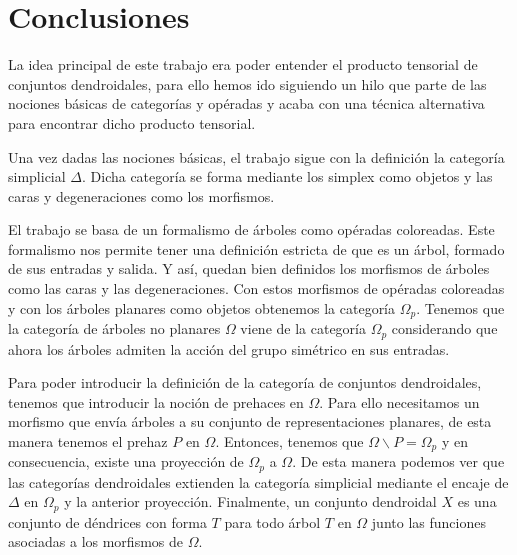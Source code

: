 \documentclass[11pt,a4paper,openright,oneside]{article}
\numberwithin{equation}{section}
\theoremstyle{definition}
\begin{document}

\setcounter{page}{1}



\newpage


\newpage


\newpage


\newpage
\section{Conclusiones}

La idea principal de este trabajo era poder entender el producto tensorial de conjuntos dendroidales, para ello hemos ido siguiendo un hilo que parte de las nociones b\'asicas de categor\'ias y op\'eradas y acaba con una t\'ecnica alternativa para encontrar dicho producto tensorial.

Una vez dadas las nociones b\'asicas, el trabajo sigue con la definici\'on la categor\'ia simplicial $\Delta$. Dicha categor\'ia se forma mediante los simplex como objetos y las caras y degeneraciones como los morfismos.

El trabajo se basa de un formalismo de \'arboles como op\'eradas coloreadas. Este formalismo nos permite tener una definici\'on estricta de que es un \'arbol, formado de sus entradas y salida.
Y as\'i, quedan bien definidos los morfismos de \'arboles como las caras y las degeneraciones. Con estos morfismos de op\'eradas coloreadas y con los \'arboles planares como objetos obtenemos la categor\'ia $\Omega_p$.
Tenemos que la categor\'ia de \'arboles no planares $\Omega$ viene de la categor\'ia $\Omega_p$ considerando que ahora los \'arboles admiten la acci\'on del grupo sim\'etrico en sus entradas.

Para poder introducir la definici\'on de la categor\'ia de conjuntos dendroidales, tenemos que introducir la noci\'on de prehaces en $\Omega$. Para ello necesitamos un morfismo que env\'ia \'arboles a su conjunto de representaciones planares, de esta manera tenemos el prehaz $P$ en $\Omega$. Entonces, tenemos que $\Omega\backslash P = \Omega_p$ y en consecuencia, existe una proyecci\'on de $\Omega_p$ a $\Omega$.
De esta manera podemos ver que las categor\'ias dendroidales extienden la categor\'ia simplicial mediante el encaje de $\Delta$ en $\Omega_p$ y la anterior proyecci\'on. 
Finalmente, un conjunto dendroidal $X$ es una conjunto de d\'endrices con forma $T$ para todo \'arbol $T$ en $\Omega$ junto las funciones asociadas a los morfismos de $\Omega$.
\end{document}
